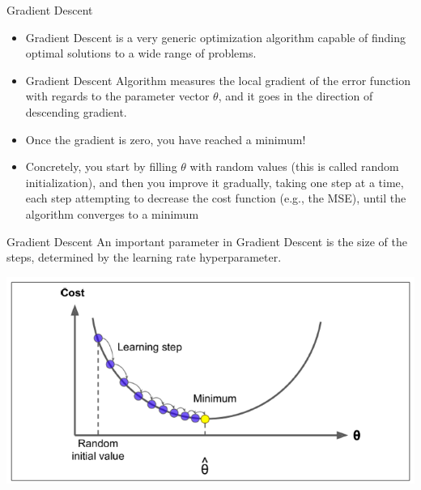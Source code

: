 \documentclass[11pt]{beamer}
\begin{document}
\begin{frame}{Gradient Descent}
   \begin{itemize}
      \item   				  						  
		Gradient Descent is a very generic optimization algorithm capable of finding optimal solutions to a wide range of problems. 
	  \item Gradient Descent Algorithm measures the local gradient of the error function with regards to the parameter vector $\theta$, and it goes in the direction of descending gradient. 
	  \item Once the gradient is zero, you have reached a minimum!
      \item Concretely, you start by filling $\theta$ with random values (this is called random initialization), and then you improve it gradually, taking one step at a time, each step attempting to decrease the cost function (e.g., the MSE), until the algorithm converges to a minimum		  
   \end{itemize}
\end{frame}
\begin{frame}{Gradient Descent}
An important parameter in Gradient Descent is the size of the steps, determined by
the learning rate hyperparameter. 
   \begin{center}
   \includegraphics[scale=.6]{../05-pictures/lesson-1-1_pic_8.png} 	
   \end{center}
\end{frame}
\end{document}

